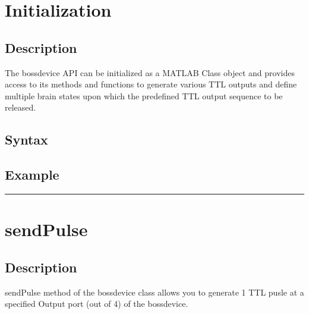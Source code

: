 \documentclass[letterpaper,10pt,english]{sphinxmanual}
\begin{document}
\section{Initialization}
\label{\detokenize{4_api_documentation:initialization}}

\subsection{Description}
\label{\detokenize{4_api_documentation:description}}
\sphinxAtStartPar
The bossdevice API can be initialized as a MATLAB Class object and provides access to its methods and functions to generate various TTL outputs and define multiple brain states upon which the predefined TTL output sequence to be released.


\subsection{Syntax}
\label{\detokenize{4_api_documentation:syntax}}
\begin{sphinxVerbatim}[commandchars=\\\{\}]
\PYG{p}{[}\PYG{p}{]}
\end{sphinxVerbatim}


\subsection{Example}
\label{\detokenize{4_api_documentation:example}}
\begin{sphinxVerbatim}[commandchars=\\\{\}]
\end{sphinxVerbatim}


\bigskip\hrule\bigskip



\section{sendPulse}
\label{\detokenize{4_api_documentation:sendpulse}}

\subsection{Description}
\label{\detokenize{4_api_documentation:id1}}
\sphinxAtStartPar
sendPulse method of the bossdevice class allows you to generate 1 TTL pusle at a specified Output port (out of 4) of the bossdevice.
\end{document}
